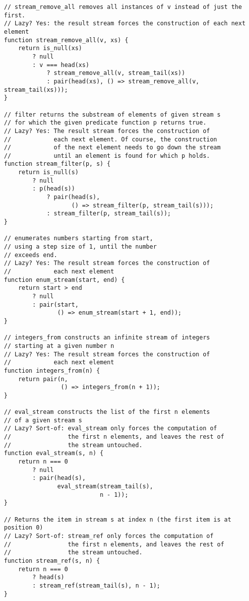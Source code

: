 \begin{lstlisting}
// stream_remove_all removes all instances of v instead of just the first.
// Lazy? Yes: the result stream forces the construction of each next element
function stream_remove_all(v, xs) {
    return is_null(xs)
        ? null
        : v === head(xs)
            ? stream_remove_all(v, stream_tail(xs))
            : pair(head(xs), () => stream_remove_all(v, stream_tail(xs))); 
}

// filter returns the substream of elements of given stream s
// for which the given predicate function p returns true.
// Lazy? Yes: The result stream forces the construction of
//            each next element. Of course, the construction
//            of the next element needs to go down the stream
//            until an element is found for which p holds.
function stream_filter(p, s) {
    return is_null(s)
        ? null
        : p(head(s))
            ? pair(head(s), 
                   () => stream_filter(p, stream_tail(s)));
            : stream_filter(p, stream_tail(s));
}

// enumerates numbers starting from start,
// using a step size of 1, until the number
// exceeds end.
// Lazy? Yes: The result stream forces the construction of
//            each next element
function enum_stream(start, end) {
    return start > end
        ? null
        : pair(start, 
               () => enum_stream(start + 1, end)); 
}

// integers_from constructs an infinite stream of integers
// starting at a given number n
// Lazy? Yes: The result stream forces the construction of
//            each next element
function integers_from(n) {
    return pair(n,
                () => integers_from(n + 1));
}

// eval_stream constructs the list of the first n elements
// of a given stream s
// Lazy? Sort-of: eval_stream only forces the computation of
//                the first n elements, and leaves the rest of
//                the stream untouched.
function eval_stream(s, n) {
    return n === 0
        ? null
        : pair(head(s),
               eval_stream(stream_tail(s),
                           n - 1));
}

// Returns the item in stream s at index n (the first item is at position 0)
// Lazy? Sort-of: stream_ref only forces the computation of
//                the first n elements, and leaves the rest of
//                the stream untouched.
function stream_ref(s, n) {
    return n === 0
        ? head(s)
        : stream_ref(stream_tail(s), n - 1);
}
\end{lstlisting}
